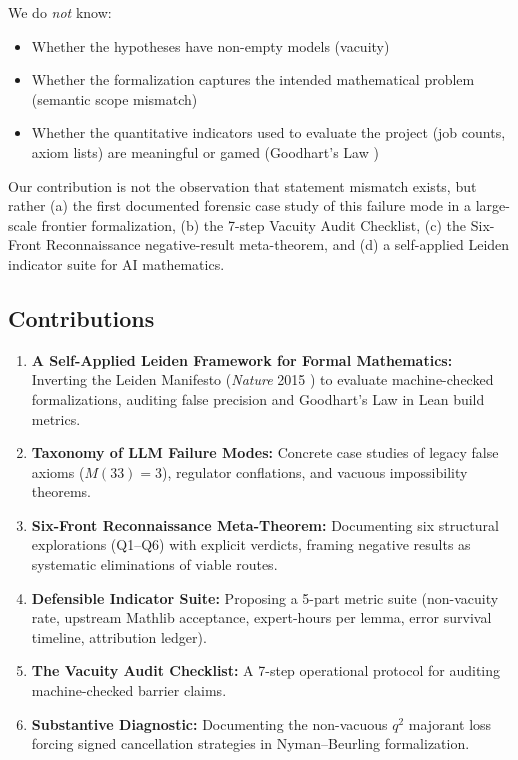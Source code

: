 \documentclass[11pt,a4paper]{article}
\theoremstyle{definition}
\theoremstyle{remark}
\begin{document}
We do \emph{not} know:
\begin{itemize}[leftmargin=2em]
  \item Whether the hypotheses have non-empty models (vacuity)
  \item Whether the formalization captures the intended mathematical problem (semantic scope mismatch)
  \item Whether the quantitative indicators used to evaluate the project (job counts, axiom lists) are meaningful or gamed (Goodhart's Law \cite{Goodhart1975,Strathern1997})
\end{itemize}

Our contribution is not the observation that statement mismatch exists, but rather (a) the first documented forensic case study of this failure mode in a large-scale frontier formalization, (b) the 7-step Vacuity Audit Checklist, (c) the Six-Front Reconnaissance negative-result meta-theorem, and (d) a self-applied Leiden indicator suite for AI mathematics.

\subsection{Contributions}

\begin{enumerate}[label=\textbf{\arabic*.}]
  \item \textbf{A Self-Applied Leiden Framework for Formal Mathematics:} Inverting the Leiden Manifesto (\emph{Nature} 2015 \cite{Hicks2015}) to evaluate machine-checked formalizations, auditing false precision and Goodhart's Law in Lean build metrics.
  \item \textbf{Taxonomy of LLM Failure Modes:} Concrete case studies of legacy false axioms ($M(33)=3$), regulator conflations, and vacuous impossibility theorems.
  \item \textbf{Six-Front Reconnaissance Meta-Theorem:} Documenting six structural explorations (Q1--Q6) with explicit verdicts, framing negative results as systematic eliminations of viable routes.
  \item \textbf{Defensible Indicator Suite:} Proposing a 5-part metric suite (non-vacuity rate, upstream Mathlib acceptance, expert-hours per lemma, error survival timeline, attribution ledger).
  \item \textbf{The Vacuity Audit Checklist:} A 7-step operational protocol for auditing machine-checked barrier claims.
  \item \textbf{Substantive Diagnostic:} Documenting the non-vacuous $q^2$ majorant loss forcing signed cancellation strategies in Nyman--Beurling formalization.
\end{enumerate}
\end{document}
